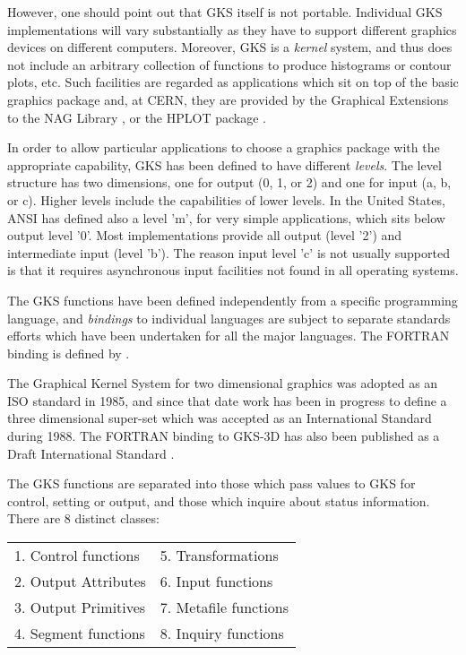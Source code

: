However, one should point out that GKS itself is not portable.
Individual GKS implementations will vary substantially as they have to
support different graphics devices on different computers.
Moreover, GKS is a {\it kernel} system, and thus does not include
an arbitrary collection of functions to produce histograms or
contour plots, etc. Such facilities are regarded as applications
which sit on top of the basic graphics package and, at CERN,
they are provided by the Graphical Extensions to the NAG Library
\cite{bib-nagref}, or the HPLOT package \cite{bib-HPLOT}.
 
In order to allow particular applications to choose a graphics package
with the appropriate capability, GKS has been defined to have
different {\it levels}. The level structure has two dimensions,
one for output (0, 1, or 2) and one for input (a, b, or c).
Higher levels include the capabilities of lower levels.
In the United States, ANSI has defined also a level 'm', for very simple
applications, which sits below output level '0'.
Most implementations provide all output (level '2') and intermediate
input (level 'b'). The reason input level 'c' is not usually supported
is that it requires asynchronous input facilities not found in all
operating systems.
 
The GKS functions have been defined independently from a specific
programming language, and {\it bindings} to individual languages are
subject to separate standards efforts which have been undertaken
for all the major languages.
The FORTRAN binding is defined by \cite{bib-gksftn}.
 
The Graphical Kernel System for two dimensional graphics was
adopted as an ISO standard in 1985, and since that date work has been
in progress to define a three dimensional super-set \cite{bib-gks3d}
which was accepted as an International Standard during 1988.
The FORTRAN binding to GKS-3D has also been published as a
Draft International Standard \cite{bib-gksftn3}.
 
The GKS functions are separated into those which pass values to GKS for
control, setting or output, and those which inquire about
status information. There are 8 distinct classes:
 
\begin{center}
\begin{tabular}{ll}
1. Control functions&5. Transformations\\
2. Output Attributes&6. Input functions\\
3. Output Primitives&7. Metafile functions\\
4. Segment functions&8. Inquiry functions\\
\end{tabular}
\end{center}
 
